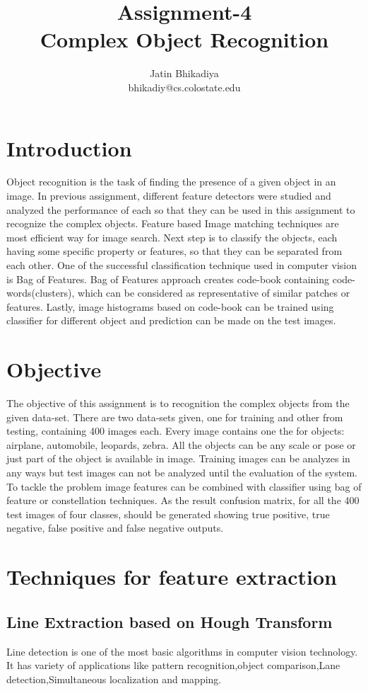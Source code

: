 \documentclass[11pt]{article}
\title{Assignment-4 \\ Complex Object Recognition 
}
\author{Jatin Bhikadiya \\
bhikadiy@cs.colostate.edu}
\begin{document}
\maketitle
\tableofcontents
\newpage
\section{Introduction}
Object recognition is the task of finding the presence of a given object in an image. In previous assignment, different feature detectors were studied and analyzed the performance of each so that they can be used in this assignment to recognize the complex objects.  Feature based Image matching techniques are most efficient way for image search. Next step is to classify the objects, each having some specific property or features, so that they can be separated from each other. One of the successful classification technique used in computer vision is Bag of Features. Bag of Features approach creates code-book containing code-words(clusters), which can be considered as representative of similar patches or features. Lastly, image histograms based on code-book can be trained using classifier for different object and prediction can be made on the test images. 
 
\section{Objective}
The objective of this assignment is to recognition the complex objects from the given data-set. There are two data-sets given, one for training and other from testing, containing 400 images each. Every image contains one the for objects: airplane, automobile, leopards, zebra. All the objects can be any scale or pose or just part of the object is available in image. Training images can be analyzes in any ways but test images can not be analyzed until the evaluation of the system. To tackle the problem image features can be combined with classifier using bag of feature or constellation techniques. As the result confusion matrix, for all the 400 test images of four classes, should be generated showing true positive, true negative, false positive  and false negative outputs.

\section{Techniques for feature extraction}


\subsection{Line Extraction based on Hough Transform}
Line detection is one of the most basic algorithms in computer vision technology. It has variety of applications like pattern recognition,object comparison,Lane detection,Simultaneous localization and mapping.
\end{document}
